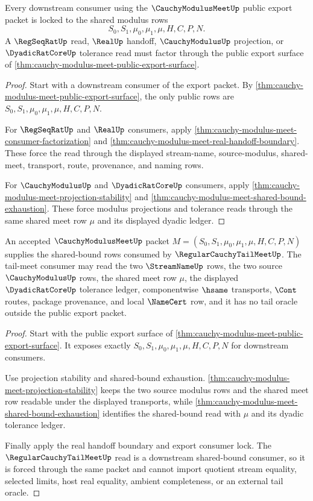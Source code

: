 \begin{theorem}
\label{thm:cauchy-modulus-meet-export-consumer-lock}
Every downstream consumer using the $\CauchyModulusMeetUp$ public export packet is locked to the shared modulus rows
$$
S_0,S_1,\mu_0,\mu_1,\mu,H,C,P,N.
$$
A $\RegSeqRatUp$ read, $\RealUp$ handoff, $\CauchyModulusUp$ projection, or $\DyadicRatCoreUp$ tolerance read must factor through the public export surface of \autoref{thm:cauchy-modulus-meet-public-export-surface}.
\end{theorem}
\begin{proof}
Start with a downstream consumer of the export packet. By \autoref{thm:cauchy-modulus-meet-public-export-surface}, the only public rows are $S_0,S_1,\mu_0,\mu_1,\mu,H,C,P,N$.

For $\RegSeqRatUp$ and $\RealUp$ consumers, apply \autoref{thm:cauchy-modulus-meet-consumer-factorization} and \autoref{thm:cauchy-modulus-meet-real-handoff-boundary}. These force the read through the displayed stream-name, source-modulus, shared-meet, transport, route, provenance, and naming rows.

For $\CauchyModulusUp$ and $\DyadicRatCoreUp$ consumers, apply \autoref{thm:cauchy-modulus-meet-projection-stability} and \autoref{thm:cauchy-modulus-meet-shared-bound-exhaustion}. These force modulus projections and tolerance reads through the same shared meet row $\mu$ and its displayed dyadic ledger.
\end{proof}

\begin{theorem}
\label{thm:cauchy-modulus-meet-tailmeet-handoff}
An accepted $\CauchyModulusMeetUp$ packet $M=(S_0,S_1,\mu_0,\mu_1,\mu,H,C,P,N)$ supplies the shared-bound rows consumed by $\RegularCauchyTailMeetUp$. The tail-meet consumer may read the two $\StreamNameUp$ rows, the two source $\CauchyModulusUp$ rows, the shared meet row $\mu$, the displayed $\DyadicRatCoreUp$ tolerance ledger, componentwise $\hsame$ transports, $\Cont$ routes, package provenance, and local $\NameCert$ row, and it has no tail oracle outside the public export packet.
\end{theorem}
\begin{proof}
Start with the public export surface of \autoref{thm:cauchy-modulus-meet-public-export-surface}. It exposes exactly $S_0,S_1,\mu_0,\mu_1,\mu,H,C,P,N$ for downstream consumers.

Use projection stability and shared-bound exhaustion. \autoref{thm:cauchy-modulus-meet-projection-stability} keeps the two source modulus rows and the shared meet row readable under the displayed transports, while \autoref{thm:cauchy-modulus-meet-shared-bound-exhaustion} identifies the shared-bound read with $\mu$ and its dyadic tolerance ledger.

Finally apply the real handoff boundary and export consumer lock. The $\RegularCauchyTailMeetUp$ read is a downstream shared-bound consumer, so it is forced through the same packet and cannot import quotient stream equality, selected limits, host real equality, ambient completeness, or an external tail oracle.
\end{proof}

